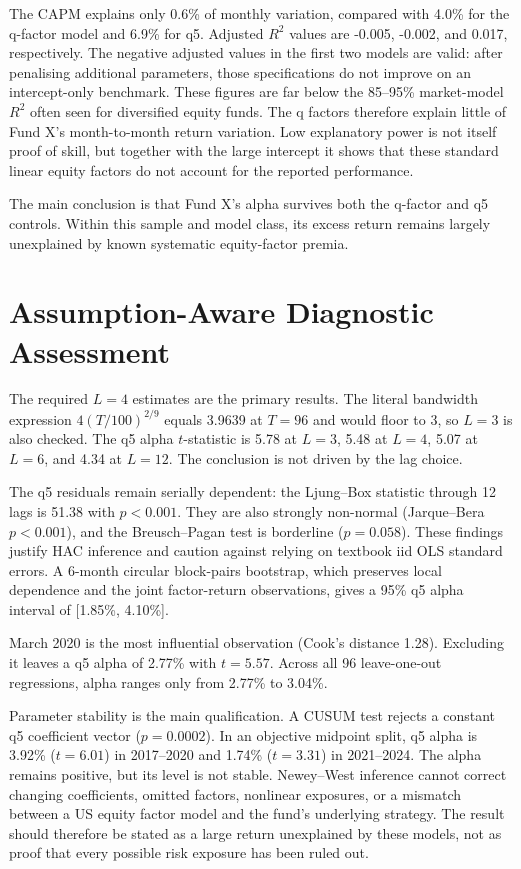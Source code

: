 \documentclass[11pt]{article}
\begin{document}
The CAPM explains only 0.6\% of monthly variation, compared with
4.0\% for the q-factor model and 6.9\% for
q5. Adjusted $R^2$ values are -0.005,
-0.002, and 0.017, respectively. The
negative adjusted values in the first two models are valid: after penalising additional
parameters, those specifications do not improve on an intercept-only benchmark. These
figures are far below the 85--95\% market-model $R^2$ often seen for diversified equity
funds. The q factors therefore explain little of Fund X's month-to-month return
variation. Low explanatory power is not itself proof of skill, but together with the
large intercept it shows that these standard linear equity factors do not account for
the reported performance.

The main conclusion is that Fund X's alpha survives both the q-factor and q5 controls.
Within this sample and model class, its excess return remains largely unexplained by
known systematic equity-factor premia.

\clearpage
\section*{Assumption-Aware Diagnostic Assessment}
The required $L=4$ estimates are the primary results. The literal bandwidth expression
$4(T/100)^{2/9}$ equals 3.9639 at $T=96$ and
would floor to 3, so $L=3$ is also checked.
The q5 alpha $t$-statistic is 5.78 at $L=3$,
5.48 at $L=4$, 5.07 at $L=6$, and
4.34 at $L=12$. The conclusion is not driven by the lag choice.

The q5 residuals remain serially dependent: the Ljung--Box statistic through 12 lags is
51.38 with $p<0.001$. They are also strongly non-normal
(Jarque--Bera $p<0.001$), and the Breusch--Pagan test is borderline
($p=0.058$). These findings justify HAC
inference and caution against relying on textbook iid OLS standard errors. A
6-month circular block-pairs bootstrap, which preserves local
dependence and the joint factor-return observations, gives a 95\% q5 alpha interval of
[1.85\%, 4.10\%].

March 2020 is the most influential observation (Cook's distance
1.28). Excluding it leaves a q5 alpha of
2.77\% with $t=5.57$.
Across all 96 leave-one-out regressions, alpha ranges only from
2.77\% to
3.04\%.

Parameter stability is the main qualification. A CUSUM test rejects a constant q5
coefficient vector ($p=0.0002$). In an objective midpoint
split, q5 alpha is 3.92\%
($t=6.01$) in 2017--2020 and
1.74\%
($t=3.31$) in 2021--2024. The alpha remains positive,
but its level is not stable. Newey--West inference cannot correct changing coefficients,
omitted factors, nonlinear exposures, or a mismatch between a US equity factor model and
the fund's underlying strategy. The result should therefore be stated as a large return
unexplained by these models, not as proof that every possible risk exposure has been ruled out.
\end{document}
